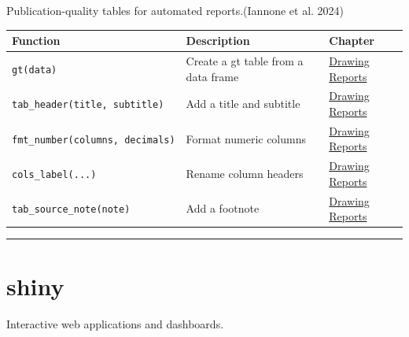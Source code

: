 \documentclass[
  11pt,
  letterpaper,
  DIV=11,
  numbers=noendperiod]{scrreprt}
\begin{document}
Publication-quality tables for automated reports.(Iannone et al. 2024)

\begin{longtable}[]{@{}
  >{\raggedright\arraybackslash}p{}
  >{\raggedright\arraybackslash}p{}
  >{\raggedright\arraybackslash}p{}@{}}
\toprule\noalign{}
\begin{minipage}[b]{\linewidth}\raggedright
Function
\end{minipage} & \begin{minipage}[b]{\linewidth}\raggedright
Description
\end{minipage} & \begin{minipage}[b]{\linewidth}\raggedright
Chapter
\end{minipage} \\
\midrule\noalign{}
\endhead
\bottomrule\noalign{}
\endlastfoot
\texttt{gt(data)} & Create a gt table from a data frame &
\hyperref[automated-drawing-reports]{Drawing Reports} \\
\texttt{tab\_header(title,\ subtitle)} & Add a title and subtitle &
\hyperref[automated-drawing-reports]{Drawing Reports} \\
\texttt{fmt\_number(columns,\ decimals)} & Format numeric columns &
\hyperref[automated-drawing-reports]{Drawing Reports} \\
\texttt{cols\_label(...)} & Rename column headers &
\hyperref[automated-drawing-reports]{Drawing Reports} \\
\texttt{tab\_source\_note(note)} & Add a footnote &
\hyperref[automated-drawing-reports]{Drawing Reports} \\
\end{longtable}

\begin{center}\rule{0.5\linewidth}{0.5pt}\end{center}

\section{shiny}\label{shiny}

Interactive web applications and dashboards.
\end{document}
